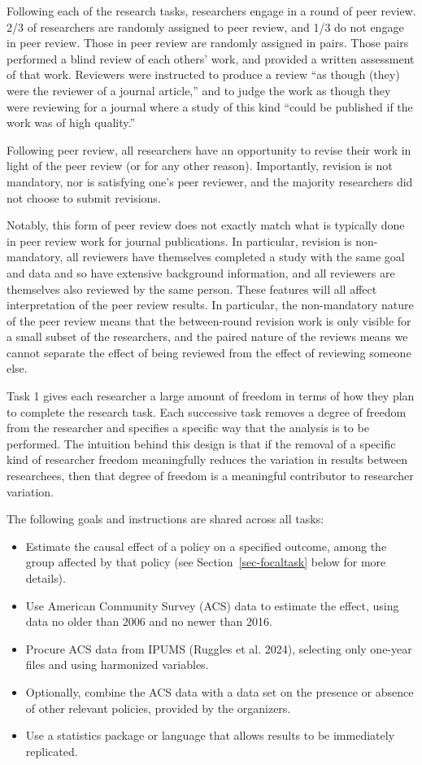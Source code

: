 \documentclass[
  letterpaper,
  DIV=11,
  numbers=noendperiod]{scrartcl}
\begin{document}
Following each of the research tasks, researchers engage in a round of
peer review. 2/3 of researchers are randomly assigned to peer review,
and 1/3 do not engage in peer review. Those in peer review are randomly
assigned in pairs. Those pairs performed a blind review of each others'
work, and provided a written assessment of that work. Reviewers were
instructed to produce a review ``as though (they) were the reviewer of a
journal article,'' and to judge the work as though they were reviewing
for a journal where a study of this kind ``could be published if the
work was of high quality.''

Following peer review, all researchers have an opportunity to revise
their work in light of the peer review (or for any other reason).
Importantly, revision is not mandatory, nor is satisfying one's peer
reviewer, and the majority researchers did not choose to submit
revisions.

Notably, this form of peer review does not exactly match what is
typically done in peer review work for journal publications. In
particular, revision is non-mandatory, all reviewers have themselves
completed a study with the same goal and data and so have extensive
background information, and all reviewers are themselves also reviewed
by the same person. These features will all affect interpretation of the
peer review results. In particular, the non-mandatory nature of the peer
review means that the between-round revision work is only visible for a
small subset of the researchers, and the paired nature of the reviews
means we cannot separate the effect of being reviewed from the effect of
reviewing someone else.

Task 1 gives each researcher a large amount of freedom in terms of how
they plan to complete the research task. Each successive task removes a
degree of freedom from the researcher and specifies a specific way that
the analysis is to be performed. The intuition behind this design is
that if the removal of a specific kind of researcher freedom
meaningfully reduces the variation in results between researchees, then
that degree of freedom is a meaningful contributor to researcher
variation.

The following goals and instructions are shared across all tasks:

\begin{itemize}
\item
  Estimate the causal effect of a policy on a specified outcome, among
  the group affected by that policy (see Section~\ref{sec-focaltask}
  below for more details).
\item
  Use American Community Survey (ACS) data to estimate the effect, using
  data no older than 2006 and no newer than 2016.
\item
  Procure ACS data from IPUMS (Ruggles et al. 2024), selecting only
  one-year files and using harmonized variables.
\item
  Optionally, combine the ACS data with a data set on the presence or
  absence of other relevant policies, provided by the organizers.
\item
  Use a statistics package or language that allows results to be
  immediately replicated.
\end{itemize}
\end{document}
